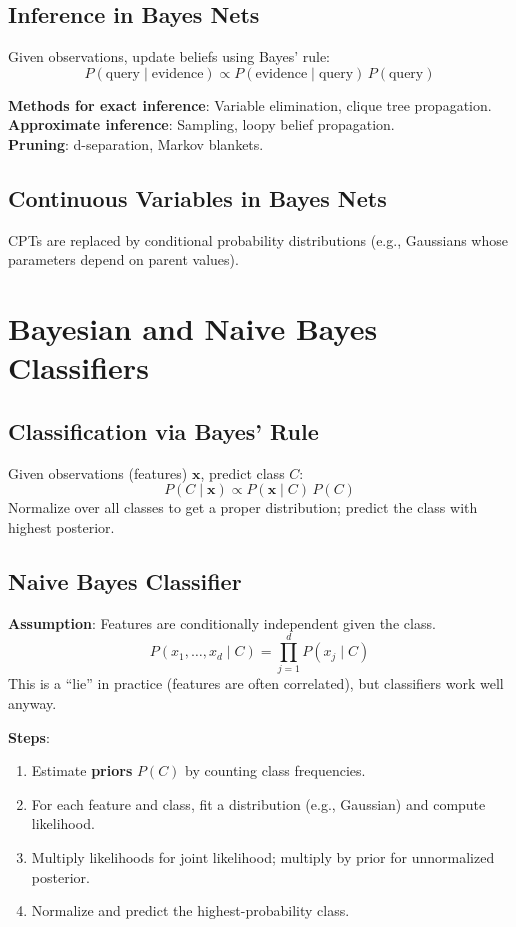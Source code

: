 \documentclass[11pt]{article}
\begin{document}
\subsection{Inference in Bayes Nets}
Given observations, update beliefs using Bayes' rule:
\[
  P(\text{query} \mid \text{evidence}) \propto P(\text{evidence} \mid \text{query})\,P(\text{query})
\]

\textbf{Methods for exact inference}: Variable elimination, clique tree propagation.\\
\textbf{Approximate inference}: Sampling, loopy belief propagation.\\
\textbf{Pruning}: d-separation, Markov blankets.

\subsection{Continuous Variables in Bayes Nets}
CPTs are replaced by conditional probability distributions (e.g., Gaussians whose parameters depend on parent values).

\section{Bayesian and Naive Bayes Classifiers}

\subsection{Classification via Bayes' Rule}
Given observations (features) $\mathbf{x}$, predict class $C$:
\[
  P(C \mid \mathbf{x}) \propto P(\mathbf{x} \mid C)\,P(C)
\]
Normalize over all classes to get a proper distribution; predict the class with highest posterior.

\subsection{Naive Bayes Classifier}
\textbf{Assumption}: Features are conditionally independent given the class.
\[
  P(x_1, \ldots, x_d \mid C) = \prod_{j=1}^d P(x_j \mid C)
\]
This is a ``lie'' in practice (features are often correlated), but classifiers work well anyway.

\textbf{Steps}:
\begin{enumerate}
  \item Estimate \textbf{priors} $P(C)$ by counting class frequencies.
  \item For each feature and class, fit a distribution (e.g., Gaussian) and compute likelihood.
  \item Multiply likelihoods for joint likelihood; multiply by prior for unnormalized posterior.
  \item Normalize and predict the highest-probability class.
\end{enumerate}
\end{document}

